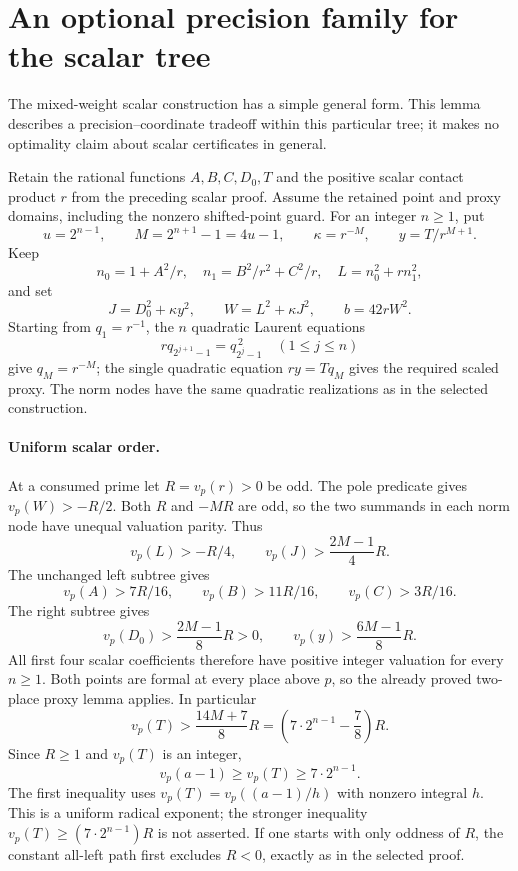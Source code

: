 \section{An optional precision family for the scalar tree}

The mixed-weight scalar construction has a simple general form. This
lemma describes a precision--coordinate tradeoff within this particular
tree; it makes no optimality claim about scalar certificates in general.

Retain the rational functions $A,B,C,D_0,T$ and the positive scalar
contact product $r$ from the preceding scalar proof. Assume the retained
point and proxy domains, including the nonzero shifted-point guard.
For an integer $n\ge1$, put
\[
 u=2^{n-1},\qquad M=2^{n+1}-1=4u-1,\qquad
 \kappa=r^{-M},\qquad y=T/r^{M+1}.
\]
Keep
\[
 n_0=1+A^2/r,\quad n_1=B^2/r^2+C^2/r,\quad
 L=n_0^2+r n_1^2,
\]
and set
\[
 J=D_0^2+\kappa y^2,\qquad W=L^2+\kappa J^2,
 \qquad b=42rW^2.
\]
Starting from $q_1=r^{-1}$, the $n$ quadratic Laurent equations
\[
 rq_{2^{j+1}-1}=q_{2^j-1}^{\,2}\quad(1\le j\le n)
\]
give $q_M=r^{-M}$; the single quadratic equation $ry=Tq_M$ gives
the required scaled proxy. The norm nodes have the same quadratic
realizations as in the selected construction.

\paragraph{Uniform scalar order.}
At a consumed prime let $R=v_p(r)>0$ be odd. The pole predicate gives
$v_p(W)>-R/2$. Both $R$ and $-MR$ are odd, so the two summands in
each norm node have unequal valuation parity. Thus
\[
 v_p(L)>-R/4,\qquad
 v_p(J)>\frac{2M-1}{4}R.
\]
The unchanged left subtree gives
\[
 v_p(A)>7R/16,\qquad v_p(B)>11R/16,\qquad v_p(C)>3R/16.
\]
The right subtree gives
\[
 v_p(D_0)>\frac{2M-1}{8}R>0,\qquad
 v_p(y)>\frac{6M-1}{8}R.
\]
All first four scalar coefficients therefore have positive integer
valuation for every $n\ge1$. Both points are formal at every place
above $p$, so the already proved two-place proxy lemma applies.
In particular
\[
 v_p(T)>\frac{14M+7}{8}R
       =\left(7\cdot2^{n-1}-\frac78\right)R.
\]
Since $R\ge1$ and $v_p(T)$ is an integer,
\[
 \boxed{\quad v_p(a-1)\ge v_p(T)
              \ge 7\cdot2^{n-1}.\quad}
\]
The first inequality uses
$v_p(T)=v_p((a-1)/h)$ with nonzero integral $h$.
This is a uniform radical exponent; the stronger inequality
$v_p(T)\ge(7\cdot2^{n-1})R$ is not asserted.
If one starts with only oddness of $R$, the constant all-left path
first excludes $R<0$, exactly as in the selected proof.

